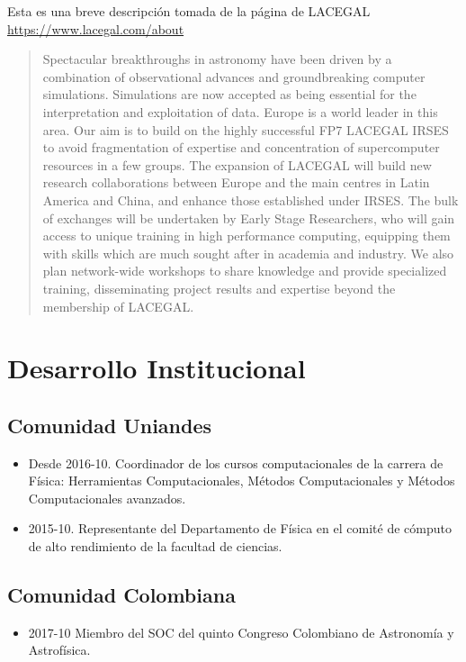 \documentclass{article}
\begin{document}
\begin{itemize}
Esta es una breve descripci\'on tomada de la p\'agina de LACEGAL \url{https://www.lacegal.com/about} 
\begin{quote}
Spectacular breakthroughs in astronomy have been driven by a combination of observational advances and groundbreaking computer simulations. Simulations are now accepted as being essential for the interpretation and exploitation of data. Europe is a world leader in this area. Our aim is to build on the highly successful FP7 LACEGAL IRSES to avoid fragmentation of expertise and concentration of supercomputer resources in a few groups. The expansion of LACEGAL will build new research collaborations between Europe and the main centres in Latin America and China, and enhance those established under IRSES. The bulk of exchanges will be undertaken by Early Stage Researchers, who will gain access to unique training in high performance computing, equipping them with skills which are much sought after in academia and industry. We also plan network-wide workshops to share knowledge and provide specialized training, disseminating project results and expertise beyond the membership of LACEGAL.
\end{quote}
\end{itemize}



\newpage
\section{Desarrollo Institucional}


\subsection{Comunidad Uniandes}
\begin{itemize}
\item {Desde 2016-10. Coordinador de los cursos computacionales de la carrera de
  F\'isica: Herramientas Computacionales, M\'etodos Computacionales y
  M\'etodos Computacionales avanzados.} 
\item {2015-10. Representante del Departamento de F\'isica en el comit\'e
  de c\'omputo de alto rendimiento de la facultad de ciencias.}
\end{itemize}


\subsection{Comunidad Colombiana}

\begin{itemize}
\item {2017-10} Miembro del SOC del quinto Congreso Colombiano de Astronom\'ia y
  Astrof\'isica.
\end{itemize}
\end{document}
